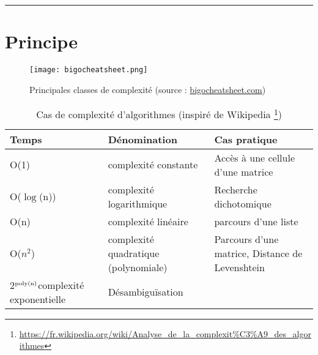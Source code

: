 
\newcommand{\numTD}{TD5}
\newcommand{\themeTD}{Complexité}


\hrule

\noindent{}

\section{Principe}

\begin{figure}[h]
\texttt{[image: bigocheatsheet.png]}
\caption{Principales classes de complexité (source : \url{bigocheatsheet.com})}
\end{figure}

\begin{table}[h]
\begin{tabular}{l|l|l}
Temps		&Dénomination		&Cas pratique\\
\hline
O(1)		& complexité constante&Accès à une cellule d'une matrice\\
O($\log$(n))	&complexité logarithmique& Recherche dichotomique\\
O(n)		&complexité linéaire&parcours d'une liste\\
O($n^{{2}}$)	&complexité quadratique (polynomiale)&Parcours d'une matrice, Distance de Levenshtein\\
2$^{{{\rm {{poly}(n)}}}}$complexité exponentielle& Désambiguïsation\\
\end{tabular}
\caption{Cas de complexité d'algorithmes (inspiré de Wikipedia \footnote{\url{https://fr.wikipedia.org/wiki/Analyse_de_la_complexit\%C3\%A9\_des\_algorithmes}})}
\end{table}


